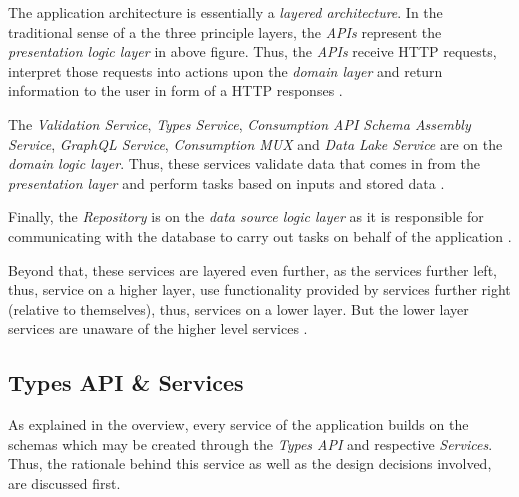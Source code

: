 The application architecture is essentially a \emph{layered architecture}. In the traditional sense of a the three principle layers, the \emph{APIs} represent the \emph{presentation logic layer} in above figure. Thus, the \emph{APIs} receive HTTP requests, interpret those requests into actions upon the \emph{domain layer} and return information to the user in form of a HTTP responses \cite{AppArchitecture}.\par
The \emph{Validation Service}, \emph{Types Service}, \emph{Consumption API Schema Assembly Service}, \emph{GraphQL Service}, \emph{Consumption MUX} and \emph{Data Lake Service} are on the \emph{domain logic layer}. Thus, these services validate data that comes in from the \emph{presentation layer} and perform tasks based on inputs and stored data \cite{AppArchitecture}.\par
Finally, the \emph{Repository} is on the \emph{data source logic layer} as it is responsible for communicating with the database to carry out tasks on behalf of the application \cite{AppArchitecture}.\par
Beyond that, these services are layered even further, as the services further left, thus, service on a higher layer, use functionality provided by services further right (relative to themselves), thus, services on a lower layer. But the lower layer services are unaware of the higher level services \cite{AppArchitecture}.

\subsection{Types API \& Services} \label{sec:Types API & Services}
As explained in the overview, every service of the application builds on the schemas which may be created through the \emph{Types API} and respective \emph{Services}. Thus, the rationale behind this service as well as the design decisions involved, are discussed first.\par


